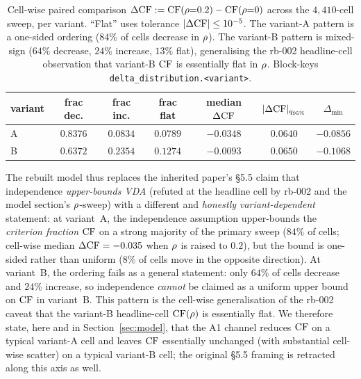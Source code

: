 \begin{table}[t]
  \centering
  \small
  \begin{tabular}{l c c c c c c}
    \toprule
    variant & frac dec. & frac inc. & frac flat &
    median $\Delta \mathrm{CF}$ & $|\Delta \mathrm{CF}|_{q_{95\%}}$ & $\Delta_{\min}$\\
    \midrule
    A & $\mathbf{0.8376}$ & $0.0834$ & $0.0789$ &
        $\mathbf{-0.0348}$ & $0.0640$ & $-0.0856$\\
    B & $0.6372$ & $\mathbf{0.2354}$ & $0.1274$ &
        $-0.0093$ & $0.0650$ & $-0.1068$\\
    \bottomrule
  \end{tabular}
  \caption{Cell-wise paired comparison
  $\Delta \mathrm{CF} := \mathrm{CF}(\rho{=}0.2) - \mathrm{CF}(\rho{=}0)$ across the
  $4{,}410$-cell sweep, per variant. ``Flat'' uses tolerance
  $|\Delta \mathrm{CF}| \le 10^{-5}$. The variant-A pattern is a one-sided
  ordering ($84\%$ of cells decrease in $\rho$). The variant-B
  pattern is mixed-sign ($64\%$ decrease, $24\%$ increase, $13\%$
  flat), generalising the rb-002 headline-cell observation that
  variant-B $\mathrm{CF}$ is essentially flat in $\rho$. Block-keys
  \texttt{delta\_distribution.<variant>}.}
  \label{tab:cf-delta-distribution}
\end{table}
%
The rebuilt model thus replaces the inherited paper's §5.5 claim
that independence \emph{upper-bounds VDA} (refuted at the headline
cell by rb-002 and the model section's $\rho$-sweep) with a
different and \emph{honestly variant-dependent} statement: at
variant~A, the independence assumption upper-bounds the
\emph{criterion fraction} $\mathrm{CF}$ on a strong majority of the primary
sweep ($84\%$ of cells; cell-wise median $\Delta \mathrm{CF} = -0.035$ when
$\rho$ is raised to $0.2$), but the bound is one-sided rather than
uniform ($8\%$ of cells move in the opposite direction). At
variant~B, the ordering fails as a general statement: only $64\%$
of cells decrease and $24\%$ increase, so independence
\emph{cannot} be claimed as a uniform upper bound on $\mathrm{CF}$ in
variant~B. This pattern is the cell-wise generalisation of the
rb-002 caveat that the variant-B headline-cell $\mathrm{CF}(\rho)$ is
essentially flat. We therefore state, here and in
Section~\ref{sec:model}, that the A1 channel reduces $\mathrm{CF}$ on a
typical variant-A cell and leaves $\mathrm{CF}$ essentially unchanged
(with substantial cell-wise scatter) on a typical variant-B cell;
the original §5.5 framing is retracted along this axis as well.

